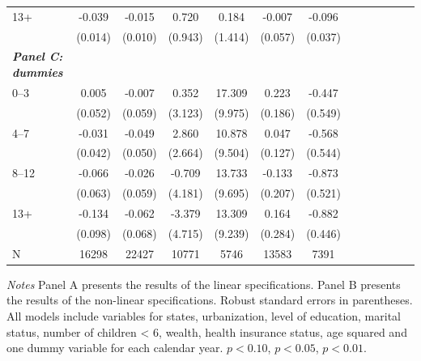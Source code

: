 \documentclass[12pt,english]{article}
\begin{document}
\begin{table}[p]
\begin{center}
\begin{adjustbox}{max width=.9\linewidth}
\begin{threeparttable}
{\begin{tabular}{l*{6}{S S}}
						13+ &    -0.039\sym{***}&   -0.015         &    0.720         &    0.184         &   -0.007         &   -0.096\sym{***}\\
						&  (0.014)         &  (0.010)         &  (0.943)         &  (1.414)         &  (0.057)         &  (0.037)         \\
						\textit{\textbf{Panel C: dummies}} &&&&&&\\
						0--3&    0.005         &   -0.007         &    0.352         &   17.309\sym{*}  &    0.223         &   -0.447         \\
						&  (0.052)         &  (0.059)         &  (3.123)         &  (9.975)         &  (0.186)         &  (0.549)         \\
						4--7&    -0.031         &   -0.049         &    2.860         &   10.878         &    0.047         &   -0.568         \\
						&  (0.042)         &  (0.050)         &  (2.664)         &  (9.504)         &  (0.127)         &  (0.544)         \\
						8--12&    -0.066         &   -0.026         &   -0.709         &   13.733         &   -0.133         &   -0.873\sym{*}  \\
						&  (0.063)         &  (0.059)         &  (4.181)         &  (9.695)         &  (0.207)         &  (0.521)         \\
						13+&   -0.134         &   -0.062         &   -3.379         &   13.309         &    0.164         &   -0.882\sym{**} \\
						&  (0.098)         &  (0.068)         &  (4.715)         &  (9.239)         &  (0.284)         &  (0.446)         \\
						\midrule
						N         &    16298         &    22427         &    10771         &     5746         &    13583         &     7391         \\
						\bottomrule
					\end{tabular}
					\begin{tablenotes}
						\item \footnotesize \textit{Notes} Panel A presents the results of the linear specifications. Panel B presents the results of the non-linear specifications. Robust standard errors in parentheses. All models include variables for  states, urbanization, level of education, marital status, number of children < 6, wealth, health insurance status, age squared and one dummy variable for each calendar year. \sym{*} \(p<0.10\), \sym{**} \(p<0.05\), \sym{***} \(p<0.01\).
					\end{tablenotes}
				}
			\end{threeparttable}
		\end{adjustbox}
	\end{center}
\end{table}
\clearpage
\end{document}

